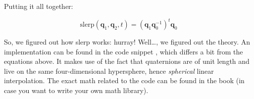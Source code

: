 \documentclass[a4paper,11pt]{article}
\begin{document}
\noindent Putting it all together:

$$\text{slerp}(\textbf{q}_1,\textbf{q}_2,t)=(\textbf{q}_1\textbf{q}_0^{-1})^t\textbf{q}_0$$

So, we figured out how slerp works: hurray! Well\dots, we figured out the theory. An implementation can be found in the code snippet , which differs a bit from the equations above. It makes use of the fact that quaternions are of unit length and live on the same four-dimensional hypersphere, hence \textit{spherical} linear interpolation. The exact math related to the code can be found in the book (in case you want to write your own math library).
\end{document}
